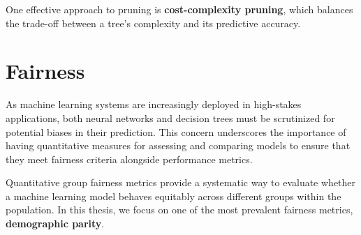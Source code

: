 One effective approach to pruning is \textbf{cost-complexity pruning},
which balances the trade-off between a tree's complexity and its predictive accuracy.
\cite{ccp}

\section{Fairness}
As machine learning systems are increasingly deployed in high-stakes applications,
both neural networks and decision trees must be scrutinized for potential biases in their prediction.
This concern underscores the importance of having quantitative measures
for assessing and comparing models to ensure that they meet fairness criteria
alongside performance metrics.

Quantitative group fairness metrics provide a systematic way
to evaluate whether a machine learning model behaves equitably
across different groups within the population.
In this thesis, we focus on one of the most prevalent fairness metrics, \textbf{demographic parity}.
\cite{dem_parity}

